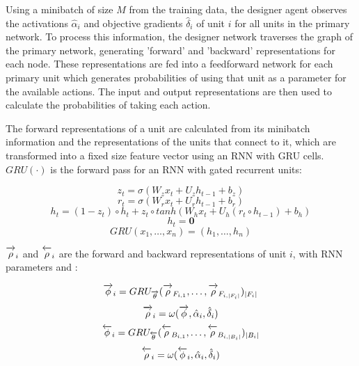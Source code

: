 \documentclass{article}[12px]
\newcommand{\ora}[1]{\overrightarrow{#1\vphantom{j}}}
\newcommand{\ola}[1]{\overleftarrow{#1\vphantom{j}}}
\begin{document}
Using a minibatch of size \(M\) from the training data, the designer agent observes the activations \(\hat{\alpha}_i\) and objective gradients \(\hat{\delta}_i\) of unit \(i\) for all units in the primary network. To process this information, the designer network traverses the graph of the primary network, generating 'forward' and 'backward' representations for each node. These representations are fed into a feedforward network for each primary unit which generates probabilities of using that unit as a parameter for the available actions. The input and output representations are then used to calculate the probabilities of taking each action.

The forward representations of a unit are calculated from its minibatch information and the representations of the units that connect to it, which are transformed into a fixed size feature vector using an RNN with GRU cells. \(GRU(\cdot)\) is the forward pass for an RNN with gated recurrent units:

\begin{equation}
  z_t = \sigma(W_zx_t + U_zh_{t-1} + b_z)
\end{equation}
\begin{equation}
  r_t = \sigma(W_rx_t + U_rh_{t-1} + b_r)
\end{equation}
\begin{equation}
  h_t = (1-z_t) \circ h_t + z_t \circ tanh(W_hx_t + U_h(r_t \circ h_{t-1}) + b_h)
\end{equation}
\begin{equation}
  h_t = \mathbf{0}
\end{equation}
\begin{equation}
  GRU(x_1, \ldots, x_n) = (h_1, \ldots, h_n)
\end{equation}

\(\ora{\rho}_i\) and \(\ola{\rho}_i\) are the forward and backward representations of unit \(i\), with RNN parameters \ora{\theta} and \ola{\theta}:

\begin{equation}
  \ora{\phi}_i = GRU_{\ora{\theta}}(\ora{\rho}_{F_{i,1}}, \ldots, \ora{\rho}_{F_{i,|F_i|}})_{|F_i|}
\end{equation}
\begin{equation}
  \ora{\rho}_i = \omega(\ora{\phi}, \hat{\alpha}_i, \hat{\delta}_i)
\end{equation}
\begin{equation}
  \ola{\phi}_i = GRU_{\ola{\theta}}(\ola{\rho}_{B_{i,1}}, \ldots, \ola{\rho}_{B_{i,|B_i|}})_{|B_i|}
\end{equation}
\begin{equation}
  \ola{\rho}_i = \omega(\ola{\phi}_i, \hat{\alpha}_i, \hat{\delta}_i)
\end{equation}
\end{document}
